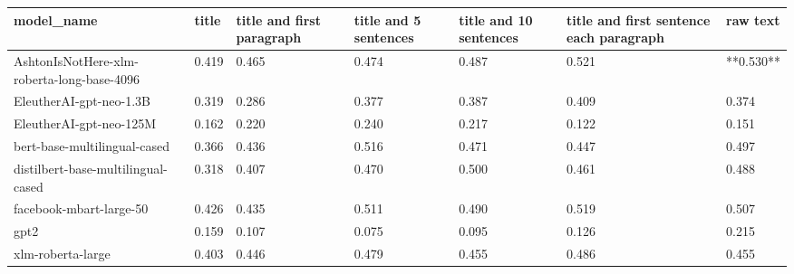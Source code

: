 \begin{tabular}{lllllll}
\toprule
                                model\_name & title & title and first paragraph & title and 5 sentences & title and 10 sentences & title and first sentence each paragraph &  raw text \\
\midrule
AshtonIsNotHere-xlm-roberta-long-base-4096 & 0.419 &                     0.465 &                 0.474 &                  0.487 &                                   0.521 & **0.530** \\
                   EleutherAI-gpt-neo-1.3B & 0.319 &                     0.286 &                 0.377 &                  0.387 &                                   0.409 &     0.374 \\
                   EleutherAI-gpt-neo-125M & 0.162 &                     0.220 &                 0.240 &                  0.217 &                                   0.122 &     0.151 \\
              bert-base-multilingual-cased & 0.366 &                     0.436 &                 0.516 &                  0.471 &                                   0.447 &     0.497 \\
        distilbert-base-multilingual-cased & 0.318 &                     0.407 &                 0.470 &                  0.500 &                                   0.461 &     0.488 \\
                   facebook-mbart-large-50 & 0.426 &                     0.435 &                 0.511 &                  0.490 &                                   0.519 &     0.507 \\
                                      gpt2 & 0.159 &                     0.107 &                 0.075 &                  0.095 &                                   0.126 &     0.215 \\
                         xlm-roberta-large & 0.403 &                     0.446 &                 0.479 &                  0.455 &                                   0.486 &     0.455 \\
\bottomrule
\end{tabular}
